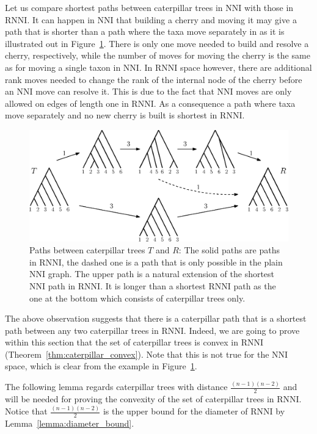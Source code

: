 \documentclass{amsart}
\newcommand{\nni}{\mathrm{NNI}}
\newcommand{\rnni}{\mathrm{RNNI}}
\begin{document}
Let us compare shortest paths between caterpillar trees in $\nni$ with those in $\rnni$.
It can happen in $\nni$ that building a cherry and moving it may give a path that is shorter than a path where the taxa move separately in as it is illustrated out in Figure~\ref{fig:NNI_vs_RNNI}.
There is only one move needed to build and resolve a cherry, respectively, while the number of moves for moving the cherry is the same as for moving a single taxon in $\nni$.
In $\rnni$ space however, there are additional rank moves needed to change the rank of the internal node of the cherry before an $\nni$ move can resolve it.
This is due to the fact that $\nni$ moves are only allowed on edges of length one in $\rnni$.
As a consequence a path where taxa move separately and no new cherry is built is shortest in $\rnni$.

\begin{figure}[H]
\centering
\includegraphics[width=\textwidth]{NNI_vs_RNNI}
\vspace{12pt}
\caption{Paths between caterpillar trees $T$ and $R$: The solid paths are paths in $\rnni$, the dashed one is a path that is only possible in the plain $\nni$ graph.
The upper path is a natural extension of the shortest $\nni$ path in $\rnni$.
It is longer than a shortest $\rnni$ path as the one at the bottom which consists of caterpillar trees only.}
\label{fig:NNI_vs_RNNI}
\end{figure}

The above observation suggests that there is a caterpillar path that is a shortest path between any two caterpillar trees in $\rnni$.
Indeed, we are going to prove within this section that the set of caterpillar trees is convex in $\rnni$ (Theorem~\ref{thm:caterpillar_convex}).
Note that this is not true for the $\nni$ space, which is clear from the example in Figure~\ref{fig:NNI_vs_RNNI}.

The following lemma regards caterpillar trees with distance $\frac{(n-1)(n-2)}{2}$ and will be needed for proving the convexity of the set of caterpillar trees in $\rnni$.
Notice that $\frac{(n-1)(n-2)}{2}$ is the upper bound for the diameter of $\rnni$ by Lemma~\ref{lemma:diameter_bound}.
\end{document}
